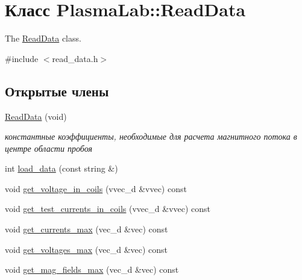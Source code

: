 \hypertarget{class_plasma_lab_1_1_read_data}{}\section{Класс Plasma\+Lab\+:\+:Read\+Data}
\label{class_plasma_lab_1_1_read_data}


The \hyperlink{class_plasma_lab_1_1_read_data}{Read\+Data} class.  




{\ttfamily \#include $<$read\+\_\+data.\+h$>$}

\subsection*{Открытые члены}
\begin{DoxyCompactItemize}
\item 
\mbox{\label{class_plasma_lab_1_1_read_data_a2e6e0771feff4b462cae01112ee93dfc}} 
\hyperlink{class_plasma_lab_1_1_read_data_a2e6e0771feff4b462cae01112ee93dfc}{Read\+Data} (void)
\begin{DoxyCompactList}\small\item\em константные коэффициенты, необходимые для расчета магнитного потока в центре области пробоя \end{DoxyCompactList}\item 
int \hyperlink{class_plasma_lab_1_1_read_data_ad83a5fc02efc593a8e91a45e1555be12}{load\+\_\+data} (const string \&)
\item 
void \hyperlink{class_plasma_lab_1_1_read_data_a3c22330a1649b5a6727f7c06c822196e}{get\+\_\+voltage\+\_\+in\+\_\+coils} (vvec\+\_\+d \&vvec) const
\item 
void \hyperlink{class_plasma_lab_1_1_read_data_a58e50ce27134e98096e7922c4efdc926}{get\+\_\+test\+\_\+currents\+\_\+in\+\_\+coils} (vvec\+\_\+d \&vvec) const
\item 
void \hyperlink{class_plasma_lab_1_1_read_data_af0f0e8aaaa2ed22c3e849bda7aca68e3}{get\+\_\+currents\+\_\+max} (vec\+\_\+d \&vec) const
\item 
void \hyperlink{class_plasma_lab_1_1_read_data_ab4ba9e63371b94deb343818e3356be8c}{get\+\_\+voltages\+\_\+max} (vec\+\_\+d \&vec) const
\item 
void \hyperlink{class_plasma_lab_1_1_read_data_aacd28b54bb8c16749867534823b41dd6}{get\+\_\+mag\+\_\+fields\+\_\+max} (vec\+\_\+d \&vec) const
\item 

\end{DoxyCompactItemize}
